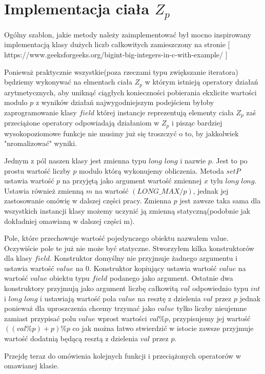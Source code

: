 \documentclass{article}
\begin{document}
\section{Implementacja ciała $Z_p$}
Ogólny szablon, jakie metody należy zaimplementować był 
mocno inspirowany implementacją klasy dużych liczb całkowitych
zamieszczony na stronie [ https://www.geeksforgeeks.org/bigint-big-integers-in-c-with-example/ ]


Ponieważ praktycznie wszystkie(poza rzeczami typu zwiększanie iteratora) będziemy wykonywać na elmentach ciała
$Z_p$ w którym istnieją operatory działań arytmetycznych, aby uniknąć ciągłych konieczności pobierania ekxlicite
wartości modulo $p$ z wyników działań najwygodniejszym podejściem byłoby zaprogramowanie klasy $field$ której instancje
reprezentują elementy ciała $Z_p$ zaś przeciążone operatory odpowiadają działaniom w $Z_p$ i pisząc bardziej 
wysokopoziomowe funkcje nie musimy już się troszczyć o to, by jakkolwiek "nromalizować" wyniki. 

Jednym z pól naszen klasy jest zmienna typu $long$ $long$ i nazwie $p$. Jest to po prostu wartość liczby $p$ 
modulo którą wykonujemy obliczenia. Metoda $setP$ ustawia wartość
$p$ na przyjętą jako argument wartość zmiennej $x$ tylu 
$long$ $long$. Ustawia również zmienną $m$ na wartość $(LONG\_MAX / p)$, jednak jej
zastosowanie omówię w dalszej części pracy. Zmienna $p$ jest zawsze taka 
sama dla wszystkich instancji klasy możemy uczynić ją zmienną statyczną(podobnie jak dokładniej 
omawianą w dalszej części m).

Pole, które przechowuje wartość pojedynczego obiektu nazwałem value. Oczywiście
pole te już nie może być statyczne.
Stworzyłem kilka konstruktorów dla klasy $field$. Konstruktor domyślny
nie przyjmuje żadnego argumentu i ustawia wartość $value$ na $0$. 
Konstruktor kopiujący ustawia wartość $value$ na wartość $value$ obiektu 
typu $field$ podanego jako argument. Ostatnie dwa konstruktory
przyjmują jako argument liczbę całkowitą $val$ odpowiednio typu
$int$ i $long$ $long$ i ustawiają wartość pola $value$ na resztę z
dzielenia $val$ przez $p$ jednak ponieważ dla uproszczenia chcemy trzymać
jako $value$ tylko liczby nieujemne zamiast przypisać polu $value$ wprost
wartości $val \% p$, przypisujemy jej wartość $((val\%p)+p)\%p$ co jak 
można łatwo stwierdzić w istocie zawsze przyjmuje wartość dodatnią będącą
resztą z dzielenia $val$ przez $p$.

Przejdę teraz do omówienia kolejnych funkcji i przeciążonych operatorów
w omawianej klasie.
\end{document}
